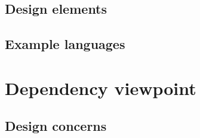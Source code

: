 		\subsection{Design elements} \label{s:template-vpv:design-elements}
			\begin{comment}
				Design entities: class, interface, power type, data type, object, attribute, method, association class, template,
				and namespace.
				Design relationships: association, generalization, dependency, realization, implementation, instance of,
				composition, and aggregation.
				Design attributes: name, role name, visibility, cardinality, type, stereotype, redefinition, tagged value,
				parameter, and navigation efficiency.
				Design constraints: value constraints, relationships exclusivity constraints, navigability, generalization sets,
				multiplicity, derivation, changeability, initial value, qualifier, ordering, static, pre-condition, post-condition,
				and generalization set constraints.
			\end{comment}
		
		\subsection{Example languages} \label{s:template-vpv:example-languages}
			\begin{comment}
				UML class diagrams and UML object diagrams (showing objects as instances of their respective classes)
				(OMG [B28]). Lattices of types and references to implemented types are commonly used as supplementary
				information.
			\end{comment}
			
	\section{Dependency viewpoint} \label{s:template-vpv:dependency-viewpoint}
		\begin{comment}
			The Dependency viewpoint specifies the relationships of interconnection and access among entities. These
			relationships include shared information, order of execution, or parameterization of interfaces.
		\end{comment}
		
		\subsection{Design concerns} \label{s:template-vpv:design-concerns}
			\begin{comment}
				A Dependency view provides an overall picture of the design subject in order to assess the impact of
				requirements or design changes. It can help maintainers to isolate entities causing system failures or
				resource bottlenecks. It can aid in producing the system integration plan by identifying the entities that are
				needed by other entities and that must be developed first. This description can also be used by integration
				testing to aid in the production of integration test cases.
			\end{comment}